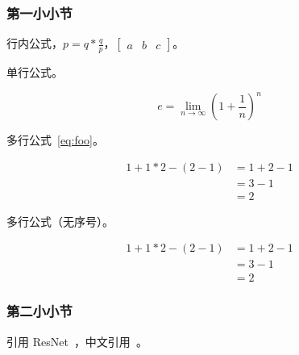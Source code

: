 \subsubsection{第一小小节}

行内公式，$p = q * \frac{q}{p}$，$\begin{bmatrix} a & b & c \end{bmatrix}$。

单行公式。

\begin{equation}
    e = \lim_{n\to \infty} \left(1 + \frac{1}{n}\right)^n
\end{equation}

多行公式~\ref{eq:foo}。

\begin{equation}
    \begin{aligned}
        1+ 1*2 - (2-1) & = 1+ 2 - 1 \\
                       & = 3-1      \\
                       & = 2
    \end{aligned}
    \label{eq:foo}
\end{equation}

多行公式（无序号）。

\begin{equation*}
    \begin{aligned}
        1+ 1*2 - (2-1) & = 1+ 2 - 1 \\
                       & = 3-1      \\
                       & = 2
    \end{aligned}
\end{equation*}

\subsubsection{第二小小节}

引用 ResNet~\cite{he2016deep}，中文引用~\cite{libaiThesis,chenjinbiao1980jixian}。



